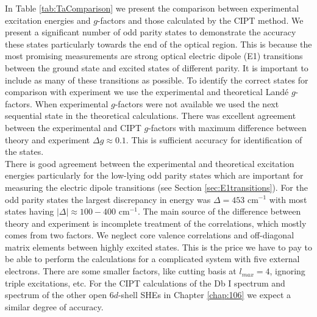 \documentclass[10pt,a4paper, twoside, openright]{report}
\begin{document}
\linebreak
In Table \ref{tab:TaComparison} we present the comparison between experimental excitation energies and $g$-factors and those calculated by the CIPT method.  We present a significant number of odd parity states to demonstrate the accuracy these states particularly towards the end of the optical region. This is because the most promising measurements are strong optical electric dipole (E1) transitions between the ground state and excited states of different parity. 
It is important to include as many of these transitions as possible. To identify the correct states for comparison with experiment 
we use the experimental and theoretical Land\'{e} $g$-factors. When experimental $g$-factors were not available we used the next sequential state in the theoretical calculations. There was excellent agreement between the experimental and CIPT $g$-factors with maximum difference between theory and experiment $\Delta g \approx 0.1$. This is sufficient accuracy for identification of the states.\\
\linebreak
There is good agreement between the experimental and theoretical excitation energies particularly for the low-lying odd parity 
states which are important for measuring the electric dipole transitions (see Section \ref{sec:E1transitions}). For the odd parity
states the largest discrepancy in energy was $\Delta = 453$ cm$^{-1}$ with most states having $|\Delta| \approx 100-400$ 
cm$^{-1}$. The main source of the difference between theory and experiment is incomplete treatment of the correlations,
which mostly comes from two factors. We neglect core valence correlations and off-diagonal matrix elements between
highly excited states. This is the price we have to pay to be able to perform the calculations for a
complicated system with five external electrons. There are some smaller factors, like cutting basis at $l_{max}=4$, 
ignoring triple excitations, etc.
For the CIPT calculations of the Db I spectrum and spectrum of the other open $6d$-shell SHEs in Chapter \ref{chap:106}  we expect a similar degree of accuracy.\\
\end{document}
